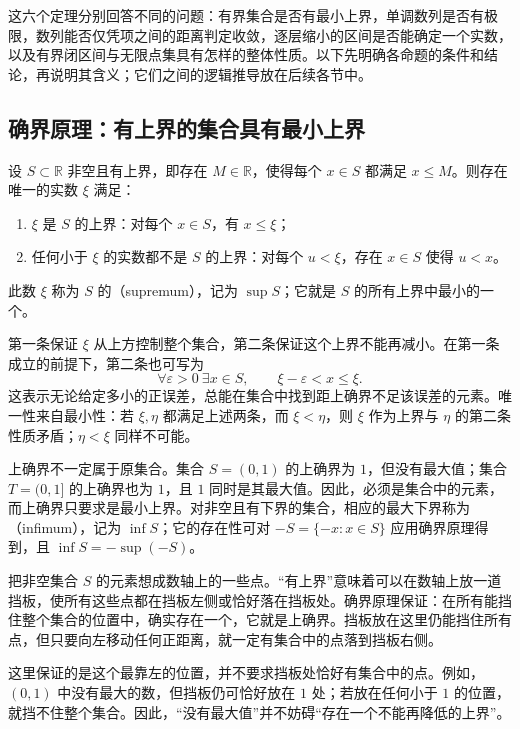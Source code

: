 \documentclass[UTF8,12pt,a4paper,fontset=fandol,oneside]{ctexart}
\begin{document}
这六个定理分别回答不同的问题：有界集合是否有最小上界，单调数列是否有极限，数列能否仅凭项之间的距离判定收敛，逐层缩小的区间是否能确定一个实数，以及有界闭区间与无限点集具有怎样的整体性质。以下先明确各命题的条件和结论，再说明其含义；它们之间的逻辑推导放在后续各节中。

\subsection{确界原理：有上界的集合具有最小上界}

\begin{theorem}[确界原理]
  \label{thm:supremum}
  设 $S\subset\mathbb R$ 非空且有上界，即存在 $M\in\mathbb R$，使得每个 $x\in S$ 都满足 $x\leq M$。则存在唯一的实数 $\xi$ 满足：
  \begin{enumerate}
    \item $\xi$ 是 $S$ 的上界：对每个 $x\in S$，有 $x\leq\xi$；
    \item 任何小于 $\xi$ 的实数都不是 $S$ 的上界：对每个 $u<\xi$，存在 $x\in S$ 使得 $u<x$。
  \end{enumerate}
  此数 $\xi$ 称为 $S$ 的（supremum），记为 $\sup S$；它就是 $S$ 的所有上界中最小的一个。
\end{theorem}

第一条保证 $\xi$ 从上方控制整个集合，第二条保证这个上界不能再减小。在第一条成立的前提下，第二条也可写为
\[
  \forall\varepsilon>0\ \exists x\in S,
  \qquad \xi-\varepsilon<x\leq\xi.
\]
这表示无论给定多小的正误差，总能在集合中找到距上确界不足该误差的元素。唯一性来自最小性：若 $\xi,\eta$ 都满足上述两条，而 $\xi<\eta$，则 $\xi$ 作为上界与 $\eta$ 的第二条性质矛盾；$\eta<\xi$ 同样不可能。

上确界不一定属于原集合。集合 $S=(0,1)$ 的上确界为 $1$，但没有最大值；集合 $T=(0,1]$ 的上确界也为 $1$，且 $1$ 同时是其最大值。因此，必须是集合中的元素，而上确界只要求是最小上界。对非空且有下界的集合，相应的最大下界称为（infimum），记为 $\inf S$；它的存在性可对 $-S=\{-x:x\in S\}$ 应用确界原理得到，且 $\inf S=-\sup(-S)$。

\begin{intuitiveexplanation}
把非空集合 $S$ 的元素想成数轴上的一些点。“有上界”意味着可以在数轴上放一道挡板，使所有这些点都在挡板左侧或恰好落在挡板处。确界原理保证：在所有能挡住整个集合的位置中，确实存在一个，它就是上确界。挡板放在这里仍能挡住所有点，但只要向左移动任何正距离，就一定有集合中的点落到挡板右侧。

这里保证的是这个最靠左的位置，并不要求挡板处恰好有集合中的点。例如，$(0,1)$ 中没有最大的数，但挡板仍可恰好放在 $1$ 处；若放在任何小于 $1$ 的位置，就挡不住整个集合。因此，“没有最大值”并不妨碍“存在一个不能再降低的上界”。
\end{intuitiveexplanation}
\end{document}

